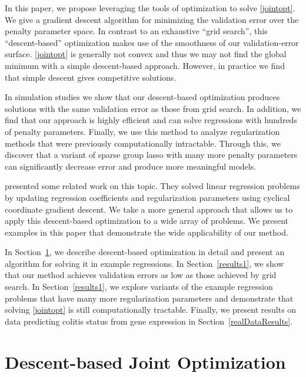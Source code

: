 \documentclass{statsoc}
\begin{document}
In this paper, we propose leveraging the tools of optimization to solve \eqref{jointopt}. We give a gradient descent algorithm for minimizing the validation error over the penalty parameter space. In contrast to an exhaustive ``grid search'', this ``descent-based'' optimization makes use of the smoothness of our validation-error surface. \eqref{jointopt} is generally not convex and thus we may not find the global minimum with a simple descent-based approach. However, in practice we find that simple descent gives competitive solutions.

In simulation studies we show that our descent-based optimization produces solutions with the same validation error as those from grid search. In addition, we find that our approach is highly efficient and can solve regressions with hundreds of penalty parameters. Finally, we use this method to analyze regularization methods that were previously computationally intractable. Through this, we discover that a variant of sparse group lasso with many more penalty parameters can significantly decrease error and produce more meaningful models.

\citet{lorbert2010descent} presented some related work on this topic. They solved linear regression problems by updating regression coefficients and regularization parameters using cyclical coordinate gradient descent. We take a more general approach that allows us to apply this descent-based optimization to a wide array of problems. We present examples in this paper that demonstrate the wide applicability of our method.

In Section~\ref{defineDescJointOpt}, we describe descent-based optimization in detail and present an algorithm for solving it in example regressions. In Section~\ref{results1}, we show that our method achieves validation errors as low as those achieved by grid search. In Section~\ref{results1}, we explore variants of the example regression problems that have many more regularization parameters and demonstrate that solving \eqref{jointopt} is still computationally tractable. Finally, we present results on data predicting colitis status from gene expression in Section~\ref{realDataResults}.

\section{Descent-based Joint Optimization}\label{defineDescJointOpt}
\end{document}
